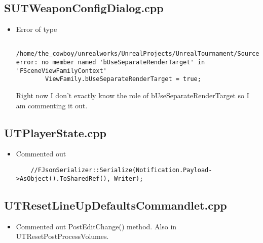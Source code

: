 \documentclass{article}
\begin{document}
                            \subsection{SUTWeaponConfigDialog.cpp}
                            \begin{itemize}
                            \item Error of type
                              \lstset{language=c++}
                              \begin{lstlisting}
                                /home/the_cowboy/unrealworks/UnrealProjects/UnrealTournament/Source/UnrealTournament/Private/Slate/Dialogs/SUTWeaponConfigDialog.cpp:684:13: error: no member named 'bUseSeparateRenderTarget' in 'FSceneViewFamilyContext'
        ViewFamily.bUseSeparateRenderTarget = true;
                              \end{lstlisting}
Right now I don't exactly know the role of bUseSeparateRenderTarget so I am commenting it out.
\end{itemize}
\subsection{UTPlayerState.cpp}
\begin{itemize}
\item Commented out
  \lstset{language=c++}
  \begin{lstlisting}
    //FJsonSerializer::Serialize(Notification.Payload->AsObject().ToSharedRef(), Writer);
  \end{lstlisting}
\end{itemize}
\subsection{UTResetLineUpDefaultsCommandlet.cpp}
\begin{itemize}
\item Commented out PostEditChange() method.  Also in UTResetPostProcessVolumes.
\end{itemize}
\end{document}
